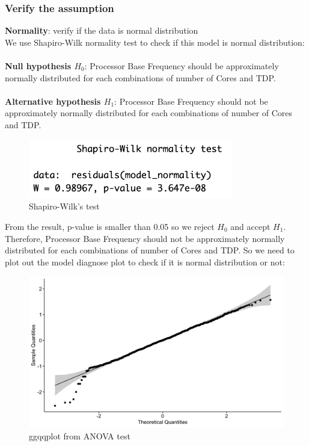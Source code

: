 \subsubsection{Verify the assumption}
\textbf{Normality}: verify if the data is normal distribution\\
We use Shapiro-Wilk normality test to check if this model is normal distribution:\\
\\
\textbf{Null hypothesis $H_0$}: Processor Base Frequency should be approximately normally distributed for each combinations of number of Cores and TDP.\\
\\
\textbf{Alternative hypothesis $H_1$}: Processor Base Frequency should not be approximately normally distributed for each combinations of number of Cores and TDP.
\begin{figure}[H]
    \centering
    \includegraphics[width=0.8\textwidth]{graphics/shapiro.png}
    \caption{Shapiro-Wilk's test}
\end{figure}
From the result, p-value is smaller than 0.05 so we reject $H_0$ and accept $H_1$. Therefore, Processor Base Frequency should not be approximately normally distributed for each combinations of number of Cores and TDP. So we need to plot out the model diagnose plot to check if it is normal distribution or not:
\begin{figure}[H]
    \centering
    \includegraphics[width=1\textwidth]{graphics/check_normality.png}
    \caption{ggqqplot from ANOVA test}
\end{figure}

